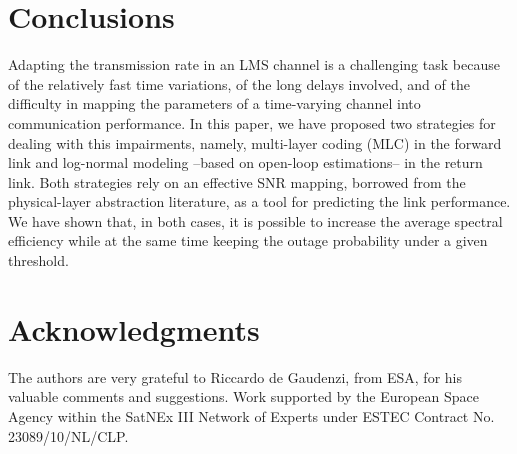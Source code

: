 \documentclass[journal,onecolumn,10pt,a4paper]{IEEEtran}
\begin{document}
\section{Conclusions}\label{sec:conclusions}
Adapting the transmission rate in an LMS channel is a challenging task because of the relatively fast time variations, of the long delays involved, and of the difficulty in mapping the parameters of a time-varying channel into communication performance. In this paper, we have proposed two strategies for dealing with this impairments, namely, multi-layer coding (MLC) in the forward link and log-normal modeling --based on open-loop estimations-- in the return link. Both strategies rely on an effective SNR mapping, borrowed from the physical-layer abstraction literature, as a tool for predicting the link performance. We have shown that, in both cases, it is possible to increase the average spectral efficiency while at the same time keeping the outage probability under a given threshold.

\section*{Acknowledgments}\label{sec:ack}

The authors are very grateful to Riccardo de Gaudenzi, from ESA, for his valuable comments and suggestions. 
Work supported by the European Space Agency within the SatNEx III Network of Experts  under ESTEC Contract No. 23089/10/NL/CLP.
\end{document}
